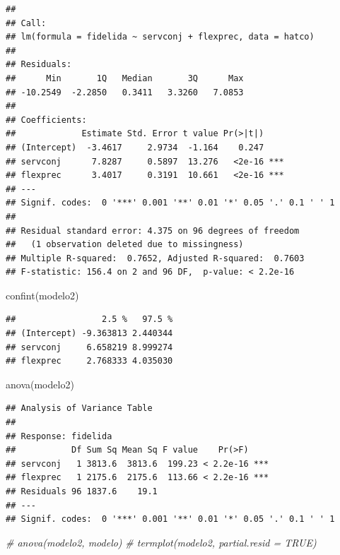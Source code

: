 \documentclass[
]{book}
\newenvironment{Shaded}{\begin{snugshade}}{\end{snugshade}}
\newcommand{\CommentTok}[1]{\textcolor[rgb]{0.56,0.35,0.01}{\textit{#1}}}
\newcommand{\FunctionTok}[1]{\textcolor[rgb]{0.00,0.00,0.00}{#1}}
\newcommand{\NormalTok}[1]{#1}
\theoremstyle{break}
\theoremstyle{nonumberplain}
\begin{document}
\begin{verbatim}
## 
## Call:
## lm(formula = fidelida ~ servconj + flexprec, data = hatco)
## 
## Residuals:
##      Min       1Q   Median       3Q      Max 
## -10.2549  -2.2850   0.3411   3.3260   7.0853 
## 
## Coefficients:
##             Estimate Std. Error t value Pr(>|t|)    
## (Intercept)  -3.4617     2.9734  -1.164    0.247    
## servconj      7.8287     0.5897  13.276   <2e-16 ***
## flexprec      3.4017     0.3191  10.661   <2e-16 ***
## ---
## Signif. codes:  0 '***' 0.001 '**' 0.01 '*' 0.05 '.' 0.1 ' ' 1
## 
## Residual standard error: 4.375 on 96 degrees of freedom
##   (1 observation deleted due to missingness)
## Multiple R-squared:  0.7652, Adjusted R-squared:  0.7603 
## F-statistic: 156.4 on 2 and 96 DF,  p-value: < 2.2e-16
\end{verbatim}

\begin{Shaded}
\begin{Highlighting}[]
\FunctionTok{confint}\NormalTok{(modelo2)}
\end{Highlighting}
\end{Shaded}

\begin{verbatim}
##                 2.5 %   97.5 %
## (Intercept) -9.363813 2.440344
## servconj     6.658219 8.999274
## flexprec     2.768333 4.035030
\end{verbatim}

\begin{Shaded}
\begin{Highlighting}[]
\FunctionTok{anova}\NormalTok{(modelo2)}
\end{Highlighting}
\end{Shaded}

\begin{verbatim}
## Analysis of Variance Table
## 
## Response: fidelida
##           Df Sum Sq Mean Sq F value    Pr(>F)    
## servconj   1 3813.6  3813.6  199.23 < 2.2e-16 ***
## flexprec   1 2175.6  2175.6  113.66 < 2.2e-16 ***
## Residuals 96 1837.6    19.1                      
## ---
## Signif. codes:  0 '***' 0.001 '**' 0.01 '*' 0.05 '.' 0.1 ' ' 1
\end{verbatim}

\begin{Shaded}
\begin{Highlighting}[]
\CommentTok{\# anova(modelo2, modelo)}
\CommentTok{\# termplot(modelo2, partial.resid = TRUE)}
\end{Highlighting}
\end{Shaded}
\end{document}
